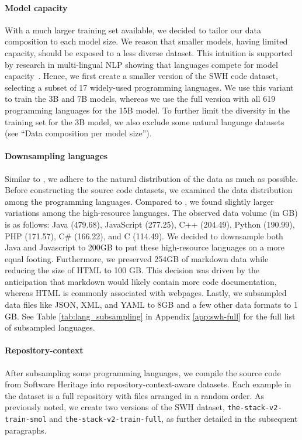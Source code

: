 \documentclass[10pt]{article} %
\begin{document}
\paragraph{Model capacity} With a much larger training set available, we decided to tailor our data composition to each model size. We reason that smaller models, having limited capacity, should be exposed to a less diverse dataset. This intuition is supported by research in multi-lingual NLP showing that languages compete for model capacity~\citep{arivazhagan2019massively,conneau-etal-2020-unsupervised,scao2022language}.  Hence, we first create a smaller version of the SWH code dataset, selecting a subset of 17 widely-used programming languages. We use this variant to train the 3B and 7B models, whereas we use the full version with all 619 programming languages for the 15B model. To further limit the diversity in the training set for the 3B model, we also exclude some natural language datasets (see ``Data composition per model size''). 

\paragraph{Downsampling languages} Similar to \starcoderbase{}, we adhere to the natural distribution of the data as much as possible. Before constructing the source code datasets, we examined the data distribution among the programming languages. Compared to \starcoderbase{}, we found slightly larger variations among the high-resource languages. The observed data volume (in GB) is as follows: Java (479.68), JavaScript (277.25), C++ (204.49), Python (190.99), PHP (171.57), C\# (166.22), and C (114.49). We decided to downsample both Java and Javascript to 200GB to put these high-resource languages on a more equal footing. Furthermore, we preserved 254GB of markdown data while reducing the size of HTML to 100 GB. This decision was driven by the anticipation that markdown would likely contain more code documentation, whereas HTML is commonly associated with webpages. Lastly, we subsampled data files like JSON, XML, and YAML to 8GB and a few other data formats to 1 GB. See Table \ref{tab:lang_subsampling} in Appendix \ref{app:swh-full} for the full list of subsampled languages. 

\paragraph{Repository-context} After subsampling some programming languages, we compile the source code from Software Heritage into repository-context-aware datasets. Each example in the dataset is a full repository with files arranged in a random order. As previously noted, we create two versions of the SWH dataset, \verb|the-stack-v2-train-smol| and \verb|the-stack-v2-train-full|, as further detailed in the subsequent paragraphs. 
\end{document}
